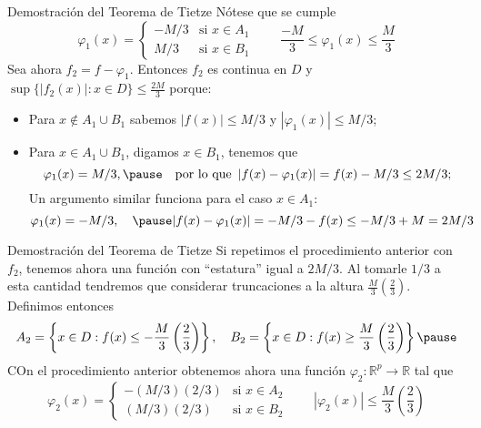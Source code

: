 \documentclass[xcolor=dvipsnames,10pt,handout, draft]{beamer}
\newcommand{\rz}{\mathbb R}
\newcommand{\rzp}{\mathbb R^{p}}
\begin{document}
\begin{frame}{Demostraci\'on del Teorema de Tietze}
N\'otese que se cumple
$$\varphi_1(x)=\left\{\begin{array}{cl}
					-M/3&\text{si }x\in A_1\\
					M/3&\text{si }x\in B_1
					\end{array}\right.\qquad \frac{-M}{3}\leq\varphi_1(x)\leq\frac{M}{3}$$
\vskip4pt\pause
Sea ahora $f_2=f-\varphi_1$. \pause\vskip5pt Entonces $f_2$ es continua en $D$ y $\displaystyle\sup\big\{|f_2(x)|:x\in D\big\}\leq \frac{2M}{3}$ porque:\pause\vskip5pt
\begin{itemize}
\item Para $x\not\in A_1\cup B_1$ sabemos $|f(x)|\leq M/3$ y $|\varphi_1(x)|\leq M/3$;\pause
\item Para $x\in A_1\cup B_1$, digamos $x\in B_1$, tenemos que 
$$\varphi_1(x)=M/3,\pause\quad \text{por lo que }\,|f(x)-\varphi_1(x)|=f(x)-M/3\leq 2M/3;$$ \pause Un argumento similar funciona para el caso $x\in A_1$:
$$\varphi_1(x)=-M/3,\quad\pause |f(x)-\varphi_1(x)|=-M/3-f(x)\leq -M/3+M=2M/3$$
\end{itemize}
\end{frame}


\begin{frame}{Demostraci\'on del Teorema de Tietze}
Si repetimos el procedimiento anterior con $f_2$, tenemos ahora una funci\'on con ``estatura'' igual a $2M/3$. 
\vskip5pt\pause
Al tomarle $1/3$ a esta cantidad tendremos que considerar truncaciones a la altura $\displaystyle\frac{M}{3}\left(\frac{2}{3}\right)$. \pause
Definimos entonces
$$A_2=\left\{x\in D:f(x)\leq-\frac{M}{3}\left(\frac{2}{3}\right)\right\},\quad B_2=\left\{x\in D:f(x)\geq \frac{M}{3}\left(\frac{2}{3}\right)\right\}\pause$$
COn el procedimiento anterior obtenemos ahora una funci\'on $\varphi_2:\rzp\to\rz$ tal que
$$\varphi_2(x)=\left\{\begin{array}{cl}
					-(M/3)(2/3)&\text{si }x\in A_2\\
					(M/3)(2/3)&\text{si }x\in B_2
					\end{array}\right.\qquad |\varphi_2(x)|\leq \frac{M}{3}\left(\frac{2}{3}\right)$$
\end{frame}
\end{document}
